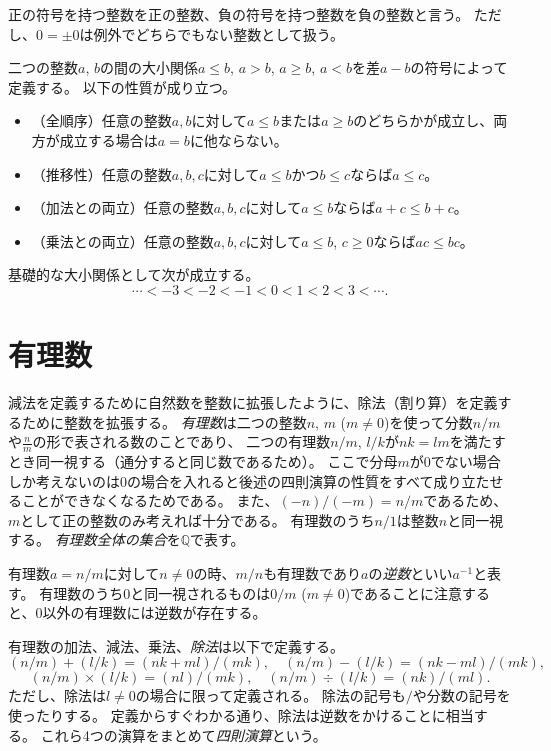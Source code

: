 正の符号を持つ整数を正の整数、負の符号を持つ整数を負の整数と言う。
ただし、$0 = \pm 0$は例外でどちらでもない整数として扱う。

二つの整数$a$, $b$の間の大小関係$a \le b$, $a > b$, $a \ge b$, $a < b$を差$a-b$の符号によって定義する。
以下の性質が成り立つ。
\begin{itemize}
\item
（全順序）任意の整数$a, b$に対して$a \le b$または$a \ge b$のどちらかが成立し、両方が成立する場合は$a = b$に他ならない。
\item
（推移性）任意の整数$a, b, c$に対して$a \le b$かつ$b \le c$ならば$a \le c$。
\item
（加法との両立）任意の整数$a, b, c$に対して$a \le b$ならば$a+c \le b+c$。
\item
（乗法との両立）任意の整数$a, b, c$に対して$a \le b$, $c \ge 0$ならば$a c \le b c$。
\end{itemize}
基礎的な大小関係として次が成立する。
$$
\cdots < -3 < -2 < -1 < 0 < 1 < 2 < 3 < \cdots.
$$

\section{有理数}

減法を定義するために自然数を整数に拡張したように、除法（割り算）を定義するために整数を拡張する。
\emph{有理数}は二つの整数$n$, $m$ ($m \ne 0$)を使って分数$n/m$や$\frac{n}{m}$の形で表される数のことであり、
二つの有理数$n/m$, $l/k$が$n k = l m$を満たすとき同一視する（通分すると同じ数であるため）。
ここで分母$m$が$0$でない場合しか考えないのは$0$の場合を入れると後述の四則演算の性質をすべて成り立たせることができなくなるためである。
また、$(-n)/(-m) = n/m$であるため、$m$として正の整数のみ考えれば十分である。
有理数のうち$n/1$は整数$n$と同一視する。
\emph{有理数全体の集合}を$\mathbb{Q}$で表す。

有理数$a = n/m$に対して$n \ne 0$の時、$m/n$も有理数であり$a$の\emph{逆数}といい$a^{-1}$と表す。
有理数のうち$0$と同一視されるものは$0/m$ ($m \ne 0$)であることに注意すると、$0$以外の有理数には逆数が存在する。

有理数の加法、減法、乗法、\emph{除法}は以下で定義する。
$$
(n/m)+(l/k) = (n k+m l)/(m k),
\quad (n/m)-(l/k) = (n k-m l)/(m k),
$$
$$
(n/m)\times(l/k) = (n l)/(m k),
\quad (n/m)\div(l/k) = (n k)/(m l).
$$
ただし、除法は$l \ne 0$の場合に限って定義される。
除法の記号も$/$や分数の記号を使ったりする。
定義からすぐわかる通り、除法は逆数をかけることに相当する。
これら4つの演算をまとめて\emph{四則演算}という。

